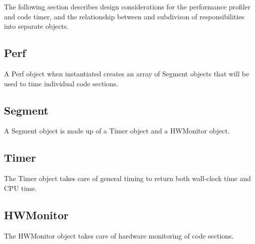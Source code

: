 

The following section describes design considerations for
the performance profiler and code timer, and the relationship 
between and subdivison of responsibilities into separate objects.

\subsection{Perf}

A Perf object when instantiated creates an array of
Segment objects that will be used to time individual
code sections.

\subsection{Segment}

A Segment object is made up of a Timer object
and a HWMonitor object.

\subsection{Timer}

The Timer object takes care of general timing to return
both wall-clock time and CPU time.

\subsection{HWMonitor}

The HWMonitor object takes care of hardware monitoring of code
sections.
